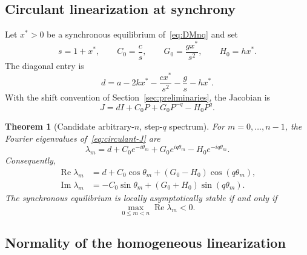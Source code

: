 \documentclass[11pt, reqno]{amsart}
\newtheorem{theorem}{Theorem}[section]
\theoremstyle{definition}
\theoremstyle{remark}
\newcommand{\Ree}{\operatorname{Re}}
\newcommand{\Imm}{\operatorname{Im}}
\begin{document}
\subsection{Circulant linearization at synchrony}

Let $x^*>0$ be a synchronous equilibrium of~\eqref{eq:DMnq} and set
\begin{equation}
\label{eq:linear-coefficients}
    s=1+x^*,
    \qquad
    C_0=\frac{c}{s},
    \qquad
    G_0=\frac{g x^*}{s^2},
    \qquad
    H_0=h x^*.
\end{equation}
The diagonal entry is
\begin{equation}
\label{eq:d-diagonal}
    d
    =
    a-2kx^*
    -\frac{c x^*}{s^2}
    -\frac{g}{s}
    -h x^*.
\end{equation}
With the shift convention of Section~\ref{sec:preliminaries}, the Jacobian is
\begin{equation}
\label{eq:circulant-J}
    J
    =
    dI+C_0P+G_0P^{-q}-H_0P^q.
\end{equation}

\begin{theorem}[Candidate arbitrary-$n$, step-$q$ spectrum]
\label{thm:general-spectrum}
For $m=0,\ldots,n-1$, the Fourier eigenvalues of~\eqref{eq:circulant-J} are
\begin{equation}
\label{eq:general-eigenvalue}
\boxed{
    \lambda_m
    =
    d
    +C_0e^{-i\theta_m}
    +G_0e^{iq\theta_m}
    -H_0e^{-iq\theta_m}.
}
\end{equation}
Consequently,
\begin{align}
\label{eq:general-real}
    \Ree\lambda_m
    &=
    d+C_0\cos\theta_m+(G_0-H_0)\cos(q\theta_m),\\
\label{eq:general-imag}
    \Imm\lambda_m
    &=
    -C_0\sin\theta_m+(G_0+H_0)\sin(q\theta_m).
\end{align}
The synchronous equilibrium is locally asymptotically stable if and only if
\[
    \max_{0\le m<n}\Ree\lambda_m<0.
\]
\end{theorem}


\subsection{Normality of the homogeneous linearization}
\end{document}
